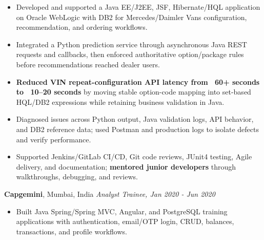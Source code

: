 \documentclass[11pt,letterpaper]{article}
\begin{document}
\begin{itemize}
  \item Developed and supported a Java EE/J2EE, JSF, Hibernate/HQL application on Oracle WebLogic with DB2 for Mercedes/Daimler Vans configuration, recommendation, and ordering workflows.
  \item Integrated a Python prediction service through asynchronous Java REST requests and callbacks, then enforced authoritative option/package rules before recommendations reached dealer users.
  \item \textbf{Reduced VIN repeat-configuration API latency from ~60+ seconds to ~10--20 seconds} by moving stable option-code mapping into set-based HQL/DB2 expressions while retaining business validation in Java.
  \item Diagnosed issues across Python output, Java validation logs, API behavior, and DB2 reference data; used Postman and production logs to isolate defects and verify performance.
  \item Supported Jenkins/GitLab CI/CD, Git code reviews, JUnit4 testing, Agile delivery, and documentation; \textbf{mentored junior developers} through walkthroughs, debugging, and reviews.
\end{itemize}
\textbf{Capgemini}, Mumbai, India \hfill \textit{Analyst Trainee, Jan 2020 - Jun 2020}
\begin{itemize}
  \item Built Java Spring/Spring MVC, Angular, and PostgreSQL training applications with authentication, email/OTP login, CRUD, balances, transactions, and profile workflows.
\end{itemize}
\end{document}
